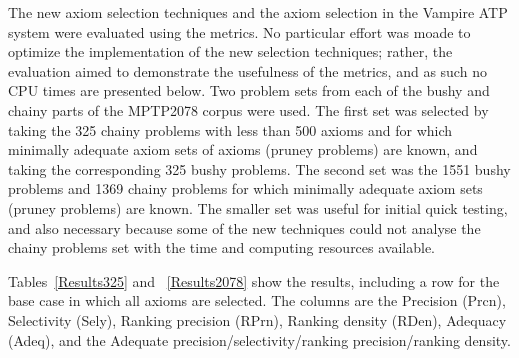 \documentclass[EPiC]{easychair}
\begin{document}
The new axiom selection techniques and the axiom selection in the Vampire 
ATP system were evaluated using the metrics.
No particular effort was moade to optimize the implementation of the new
selection techniques; rather, the evaluation aimed to demonstrate the
usefulness of the metrics, and as such no CPU times are presented below.
Two problem sets from each of the bushy and chainy parts of the MPTP2078 
corpus were used. 
The first set was selected by taking the 325 chainy problems with less than 
500 axioms and for which minimally adequate axiom sets of axioms (pruney 
problems) are known, and taking the corresponding 325 bushy problems.
The second set was the 1551 bushy problems and 1369 chainy problems for which
minimally adequate axiom sets (pruney problems) are known.
The smaller set was useful for initial quick testing, and also necessary 
because some of the new techniques could not analyse the chainy problems set 
with the time and computing resources available.

Tables~\ref{Results325} and ~\ref{Results2078} show the results, including
a row for the base case in which all axioms are selected.
The columns are the 
Precision (Prcn), 
Selectivity (Sely), 
Ranking precision (RPrn), 
Ranking density (RDen), 
Adequacy (Adeq),
and the Adequate precision/selectivity/ranking precision/ranking density.
\end{document}

